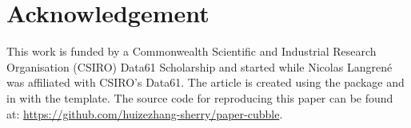 \documentclass[
  shortnames]{jss}
\begin{document}
\hypertarget{acknowledgement}{%
\section{Acknowledgement}\label{acknowledgement}}

This work is funded by a Commonwealth Scientific and Industrial Research Organisation (CSIRO) Data61 Scholarship and started while Nicolas Langrené was affiliated with CSIRO's Data61. The article is created using the package  \citep{knitr} and  \citep{rmarkdown} in  with the  template. The source code for reproducing this paper can be found at: \url{https://github.com/huizezhang-sherry/paper-cubble}.


\end{document}
